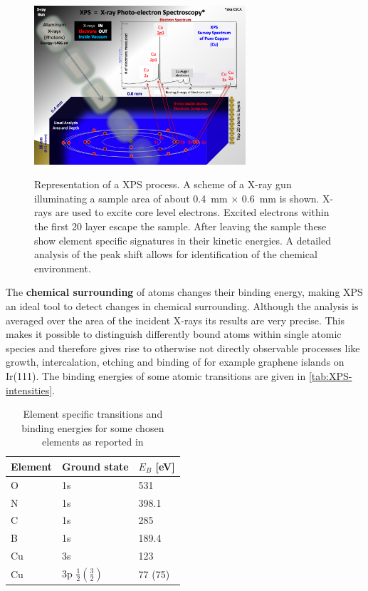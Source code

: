 \begin{figure}\centering
\includegraphics[width=0.7\textwidth]{./images/XPS_PHYSICS}
		\label{fig:XPS-excitation}
	\caption{Representation of a XPS process. A scheme of a X-ray gun illuminating a sample area of about \SI{0.4}{\milli \meter} $\times$ \SI{0.6}{\milli \meter} is shown. X-rays are used to excite core level electrons. Excited electrons within the first 20 layer escape the sample. After leaving the sample these show element specific signatures in their kinetic energies. A detailed analysis of the peak shift allows for identification of the chemical environment.}
	\label{fig:auger-core}
\end{figure}

\cite{zemlyanov_versatile_2018}
The  \textbf{chemical surrounding} of atoms changes their binding energy, making XPS an ideal tool to detect changes in chemical surrounding. Although the analysis is averaged over the area of the incident X-rays its results are very precise. This makes it possible to distinguish differently bound atoms within single atomic species and therefore gives rise to otherwise not directly observable processes like growth, intercalation, etching and binding of for example 
graphene islands on Ir(111)\cite{busse_graphene_2011-1,granas_oxygen_2012}.
The  binding energies of some atomic transitions are given in \autoref{tab:XPS-intensities}.

\begin{table}\centering
 \caption{Element specific transitions and binding energies for some chosen elements as reported in \cite{wanger_handbook_1979}}
 \begin{tabular}{lll}
  Element & Ground state & $E_B$ [eV]\\ \hline 
  O & 1s & 531\\
  N & 1s & 398.1\\
  C & 1s & 285\\
  B & 1s & 189.4 \\
  Cu & 3s & 123\\
  Cu & 3p $\frac{1}{2} (\frac{3}{2})$ & 77 (75)\\
 \end{tabular}
\label{tab:XPS-intensities}
\end{table}

